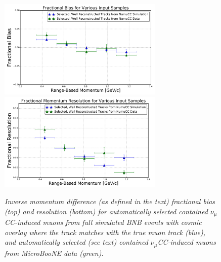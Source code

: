 \documentclass[a4paper,11pt]{article}
\begin{document}



\begin{figure}
\centering
	\includegraphics[width=0.7\textwidth]{Figures/MCS_range_bias_multiplesamples_publicplot.png}
	\includegraphics[width=0.7\textwidth]{Figures/MCS_range_resolution_multiplesamples_publicplot.png}
\caption{\textit{Inverse momentum difference (as defined in the text) fractional bias (top) and resolution (bottom) for automatically selected contained $\nu_\mu$CC-induced muons from full simulated BNB events with cosmic overlay where the track matches with the true muon track (blue), and automatically selected (see text) contained $\nu_\mu$CC-induced muons from MicroBooNE data (green).}}\label{MCS_range_bias_resolution_DataRecoTrack_fig}
\end{figure}
\end{document}

